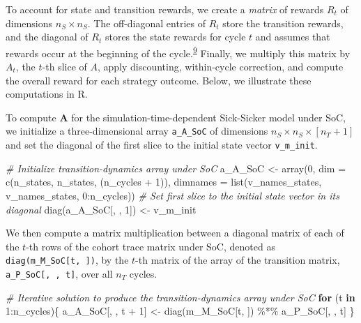 \documentclass[
]{article}
\newenvironment{Shaded}{\begin{snugshade}}{\end{snugshade}}
\newcommand{\AttributeTok}[1]{\textcolor[rgb]{0.77,0.63,0.00}{#1}}
\newcommand{\CommentTok}[1]{\textcolor[rgb]{0.56,0.35,0.01}{\textit{#1}}}
\newcommand{\ControlFlowTok}[1]{\textcolor[rgb]{0.13,0.29,0.53}{\textbf{#1}}}
\newcommand{\DecValTok}[1]{\textcolor[rgb]{0.00,0.00,0.81}{#1}}
\newcommand{\FunctionTok}[1]{\textcolor[rgb]{0.00,0.00,0.00}{#1}}
\newcommand{\NormalTok}[1]{#1}
\newcommand{\OtherTok}[1]{\textcolor[rgb]{0.56,0.35,0.01}{#1}}
\newcommand{\SpecialCharTok}[1]{\textcolor[rgb]{0.00,0.00,0.00}{#1}}
\begin{document}
To account for state and transition rewards, we create a \emph{matrix} of rewards \(R_t\) of dimensions \(n_S \times n_S\). The off-diagonal entries of \(R_t\) store the transition rewards, and the diagonal of \(R_t\) stores the state rewards for cycle \(t\) and assumes that rewards occur at the beginning of the cycle.\textsuperscript{\protect\hyperlink{ref-Krijkamp2019}{9}} Finally, we multiply this matrix by \(A_t\), the \(t\)-th slice of \(A\), apply discounting, within-cycle correction, and compute the overall reward for each strategy outcome. Below, we illustrate these computations in R.

To compute \(\mathbf{A}\) for the simulation-time-dependent Sick-Sicker model under SoC, we initialize a three-dimensional array \texttt{a\_A\_SoC} of dimensions \(n_S \times n_S \times [n_T+1]\) and set the diagonal of the first slice to the initial state vector \texttt{v\_m\_init}.

\begin{Shaded}
\begin{Highlighting}[]
\CommentTok{\# Initialize transition{-}dynamics array under SoC}
\NormalTok{a\_A\_SoC }\OtherTok{\textless{}{-}} \FunctionTok{array}\NormalTok{(}\DecValTok{0}\NormalTok{,}
             \AttributeTok{dim =} \FunctionTok{c}\NormalTok{(n\_states, n\_states, (n\_cycles }\SpecialCharTok{+} \DecValTok{1}\NormalTok{)),}
             \AttributeTok{dimnames =} \FunctionTok{list}\NormalTok{(v\_names\_states, v\_names\_states, }\DecValTok{0}\SpecialCharTok{:}\NormalTok{n\_cycles))}
\CommentTok{\# Set first slice to the initial state vector in its diagonal}
\FunctionTok{diag}\NormalTok{(a\_A\_SoC[, , }\DecValTok{1}\NormalTok{]) }\OtherTok{\textless{}{-}}\NormalTok{ v\_m\_init}
\end{Highlighting}
\end{Shaded}

We then compute a matrix multiplication between a diagonal matrix of each of the \(t\)-th rows of the cohort trace matrix under SoC, denoted as \texttt{diag(m\_M\_SoC{[}t,\ {]})}, by the \(t\)-th matrix of the array of the transition matrix, \texttt{a\_P\_SoC{[},\ ,\ t{]}}, over all \(n_T\) cycles.

\begin{Shaded}
\begin{Highlighting}[]
\CommentTok{\# Iterative solution to produce the transition{-}dynamics array under SoC}
\ControlFlowTok{for}\NormalTok{ (t }\ControlFlowTok{in} \DecValTok{1}\SpecialCharTok{:}\NormalTok{n\_cycles)\{}
\NormalTok{  a\_A\_SoC[, , t }\SpecialCharTok{+} \DecValTok{1}\NormalTok{] }\OtherTok{\textless{}{-}} \FunctionTok{diag}\NormalTok{(m\_M\_SoC[t, ]) }\SpecialCharTok{\%*\%}\NormalTok{ a\_P\_SoC[, , t]}
\NormalTok{\}}
\end{Highlighting}
\end{Shaded}
\end{document}
